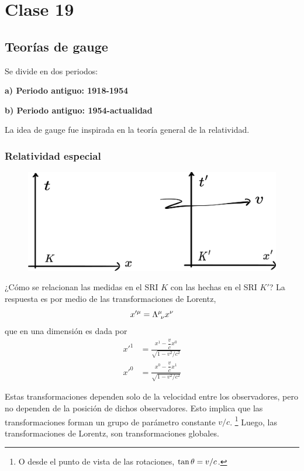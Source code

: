 \section{Clase 19}
\subsection{Teorías de gauge}
Se divide en dos periodos:

\textbf{a) Periodo antiguo: 1918-1954}

\textbf{b) Periodo antiguo: 1954-actualidad}

La idea de gauge fue inspirada en la teoría general de la relatividad.

\subsubsection{Relatividad especial}

\begin{figure}[h!]
	\centering
	\includegraphics[scale=0.2]{fig/Galileo.pdf}
\end{figure}

¿Cómo se relacionan las medidas en el SRI $K$ con las hechas en el SRI $K'$? La respuesta es por medio de las transformaciones de Lorentz,
\begin{equation}
  x'^\mu =\Lambda^\mu_{~\nu } x^\nu 
\end{equation}
que en una dimensión es dada por
\begin{align}
  x'^1&=\frac{x^1-\dfrac{v}{c}x^0}{\sqrt{1-v^2/c^2}}\\
  x'^0&=\frac{x^0-\dfrac{v}{c}x^1}{\sqrt{1-v^2/c^2}}
\end{align}

Estas transformaciones dependen solo de la velocidad entre los observadores, pero no dependen de la posición de dichos observadores. Esto implica que las transformaciones forman un grupo de parámetro constante $v/c$. \footnote{O desde el punto de vista de las rotaciones, $\tan\theta =v/c$.} Luego, las transformaciones de Lorentz, son transformaciones globales.

